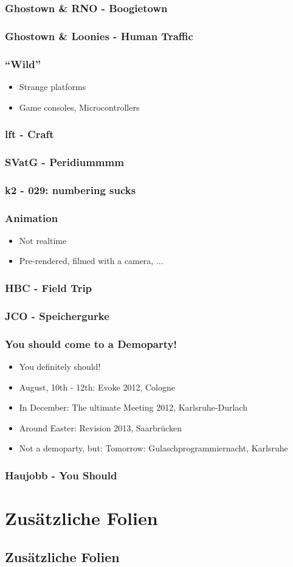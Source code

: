 \documentclass[t,14pt,aspectratio=169]{beamer}
\begin{document}
\begin{frame}
\frametitle{Ghostown \& RNO - Boogietown}
\end{frame}

\begin{frame}
\frametitle{Ghostown \& Loonies - Human Traffic}
\end{frame}

\begin{frame}
\frametitle{``Wild''}
\begin{itemize}
\item Strange platforms
\item Game consoles, Microcontrollers
\end{itemize}
\end{frame}

\begin{frame}
\frametitle{lft - Craft}
\end{frame}

\begin{frame}
\frametitle{SVatG - Peridiummmm}
\end{frame}

\begin{frame}
\frametitle{k2 - 029: numbering sucks}
\end{frame}

\begin{frame}
\frametitle{Animation}
\begin{itemize}
\item Not realtime
\item Pre-rendered, filmed with a camera, ...
\end{itemize}
\end{frame}

\begin{frame}
\frametitle{HBC - Field Trip}
\end{frame}

\begin{frame}
\frametitle{JCO - Speichergurke}
\end{frame}

\begin{frame}
\frametitle{You should come to a Demoparty!}
\begin{itemize}
\item You definitely should!
\item August, 10th - 12th: Evoke 2012, Cologne
\item In December: The ultimate Meeting 2012, Karlsruhe-Durlach
\item Around Easter: Revision 2013, Saarbrücken
\item Not a demoparty, but: Tomorrow: Gulaschprogrammiernacht, Karlsruhe
\end{itemize}
\end{frame}

\begin{frame}
\frametitle{Haujobb - You Should}
\end{frame}

\appendix
\section*{Zusätzliche Folien}
\subsection*{Zusätzliche Folien}
\end{document}
